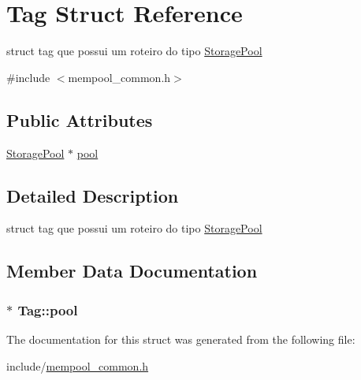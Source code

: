 \hypertarget{struct_tag}{}\section{Tag Struct Reference}
\label{struct_tag}


struct tag que possui um roteiro do tipo \hyperlink{class_storage_pool}{Storage\+Pool}  




{\ttfamily \#include $<$mempool\+\_\+common.\+h$>$}

\subsection*{Public Attributes}
\begin{DoxyCompactItemize}
\item 
\hyperlink{class_storage_pool}{Storage\+Pool} $\ast$ \hyperlink{struct_tag_aa4adbc74180401c6e0bff0a4c429f37e}{pool}
\end{DoxyCompactItemize}


\subsection{Detailed Description}
struct tag que possui um roteiro do tipo \hyperlink{class_storage_pool}{Storage\+Pool} 

\subsection{Member Data Documentation}
\subsubsection[{\texorpdfstring{pool}{pool}}]{$\ast$ Tag\+::pool}\hypertarget{struct_tag_aa4adbc74180401c6e0bff0a4c429f37e}{}\label{struct_tag_aa4adbc74180401c6e0bff0a4c429f37e}


The documentation for this struct was generated from the following file\+:\begin{DoxyCompactItemize}
\item 
include/\hyperlink{mempool__common_8h}{mempool\+\_\+common.\+h}\end{DoxyCompactItemize}

